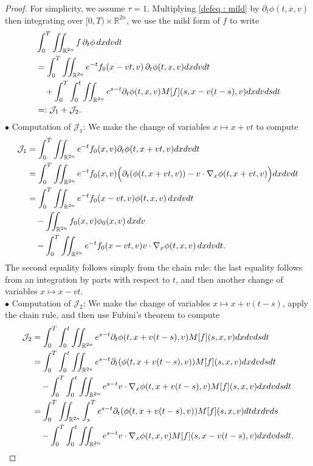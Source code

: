 \documentclass{amsart}
\theoremstyle{plain}
\theoremstyle{remark}
\numberwithin{equation}{section}
\newcommand{\calJ}{\mathcal J}
\newcommand{\p}{\partial}
\newcommand{\R}{\mathbb{R}}
\newcommand{\dx}{\textnormal{d}x}
\newcommand{\dv}{\textnormal{d}v}
\newcommand{\dt}{\textnormal{d}t}
\newcommand{\ds}{\textnormal{d}s}
\begin{document}
\begin{proof}
For simplicity, we assume $\tau =1$. Multiplying \eqref{defeq : mild} by $\p_t\phi(t,x,v)$ then integrating over $[0,T)\times\R^{2n}$, we use the mild form of $f$ to write
\begin{align*}
    &\int_0^T \iint_{\R^{2n}} f \,\p_t \phi \,\dx\dv\dt\\
    &= \int_0^T \iint_{\R^{2n}} e^{-t} f_0(x-vt,v) \, \p_t\phi(t,x,v) \dx\dv\dt\\
    &\quad + \int_0^T \int_0^t \iint_{\R^{2n}} e^{s-t} \p_t\phi(t,x,v) M[f](s,x-v(t-s),v)\dx\dv\ds\dt\\
    &=: \calJ_1 + \calJ_2.
\end{align*}
$\bullet$ Computation of $\calJ_1$: We make the change of variables $x\mapsto x+vt$ to compute
\begin{align*}
    \calJ_1 &= \int_0^T \iint_{\R^{2n}} e^{-t} f_0(x,v) \p_t\phi(t,x+vt,v)\dx\dv\dt \\
    &= \int_0^T \iint_{\R^{2n}} e^{-t} f_0(x,v) \Big(\p_t (\phi(t,x+vt,v)) - v\cdot \nabla_x\phi(t,x+vt,v) \Big) \dx\dv\dt \\
    &= \int_0^T \iint_{\R^{2n}} e^{-t} f_0(x-vt,v) \phi(t,x,v) \,\dx\dv\dt \\
    &\quad - \iint_{\R^{2n}} f_0(x,v) \phi_0(x,v) \,\dx\dv \\
    &\quad - \int_0^T \iint_{\R^{2n}} e^{-t} f_0(x-vt,v) v\cdot \nabla_x \phi(t,x,v)\,\dx\dv\dt.
\end{align*}
The second equality follows simply from the chain rule: the last equality follows from an integration by parts with respect to $t$, and then another change of variables $x\mapsto x-vt$.\\
$\bullet$ Computation of $\calJ_2$: We make the change of variables $x\mapsto x+v(t-s)$, apply the chain rule, and then use Fubini's theorem to compute
\begin{align*}
    \calJ_2 &= \int_0^T \int_0^t \iint_{\R^{2n}} e^{s-t} \p_t \phi(t,x+v(t-s),v) M[f](s,x,v)\dx\dv\ds\dt \\
    &= \int_0^T \int_0^t \iint_{\R^{2n}} e^{s-t} \p_t(\phi(t,x+v(t-s),v)) M[f](s,x,v)\dx\dv\ds\dt \\
    &\quad - \int_0^T \int_0^t \iint_{\R^{2n}} e^{s-t} v\cdot \nabla_x\phi(t,x+v(t-s),v) M[f](s,x,v)\dx\dv\ds\dt \\
    &= \int_0^T \iint_{\R^{2n}} \int_{s}^T e^{s-t} \p_t (\phi(t,x+v(t-s),v)) M[f](s,x,v)\dt\dx\dv\ds \\
    &\quad - \int_0^T \int_0^t \iint_{\R^{2n}} e^{s-t} v\cdot \nabla_x \phi(t,x,v) M[f](s,x-v(t-s),v) \dx\dv\ds\dt.

\end{align*}
\end{proof}
\end{document}
